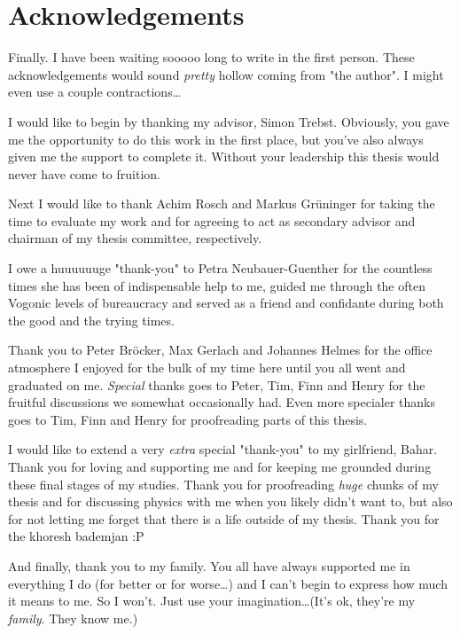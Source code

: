 \chapter*{Acknowledgements}
%
%
%
Finally.
I have been waiting sooooo long to write in the first person.
These acknowledgements would sound \textit{pretty} hollow coming from "the author".
I might even use a couple contractions\ldots

I would like to begin by thanking my advisor, Simon Trebst.
Obviously, you gave me the opportunity to do this work in the first place, but you've also always given me the support to complete it.
Without your leadership this thesis would never have come to fruition.

Next I would like to thank Achim Rosch and Markus Gr\"uninger for taking the time to evaluate my work and for agreeing to act as secondary advisor and chairman of my thesis committee, respectively.

I owe a huuuuuuge "thank-you" to Petra Neubauer-Guenther for the countless times she has been of indispensable help to me, guided me through the often Vogonic levels of bureaucracy and served as a friend and confidante during both the good and the trying times.

Thank you to Peter Br\"ocker, Max Gerlach and Johannes Helmes for the office atmosphere I enjoyed for the bulk of my time here until you all went and graduated on me.
\textit{Special} thanks goes to Peter, Tim, Finn and Henry for the fruitful discussions we somewhat occasionally had.
Even more specialer thanks goes to Tim, Finn and Henry for proofreading parts of this thesis.

I would like to extend a very \textit{extra} special "thank-you" to my girlfriend, Bahar.
Thank you for loving and supporting me and for keeping me grounded during these final stages of my studies.
Thank you for proofreading \textit{huge} chunks of my thesis and for discussing physics with me when you likely didn't want to, but also for not letting me forget that there is a life outside of my thesis.
Thank you for the khoresh bademjan :P

And finally, thank you to my family.
You all have always supported me in everything I do (for better or for worse\ldots) and I can't begin to express how much it means to me.
So I won't.
Just use your imagination\ldots (It's ok, they're my \textit{family}. They know me.)